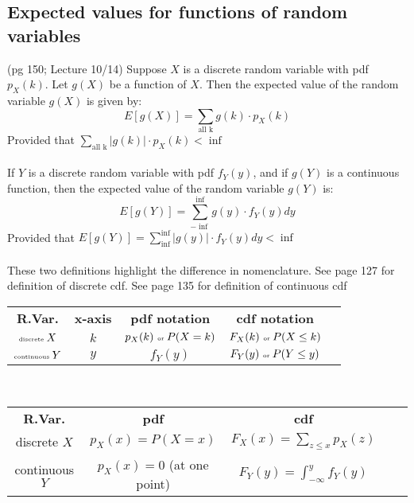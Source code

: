 \subsection{Expected values for functions of random variables}
{\tiny (pg 150; Lecture 10/14)}  Suppose $X$ is a discrete random variable with pdf $p_X(k)$.  Let $g(X)$ be a function of $X$.  Then the expected value of the random variable $g(X)$ is given by: \hfill \\
	\[ E[g(X)] = \sum\limits_{\mbox{all k}} g(k) \cdot p_X(k) \]
Provided that $\sum\limits_{\mbox{all k}} | g(k)| \cdot p_X(k) < \inf$
\hfill \\
\hfill \\
If $Y$ is a discrete random variable with pdf $f_Y(y)$, and if $g(Y)$ is a continuous function, then the expected value of the random variable $g(Y)$ is: \hfill \\
	\[ E[g(Y)] = \sum\limits_{- \inf}^{\inf} g(y) \cdot f_Y(y)dy \]
Provided that $E[g(Y)] = \sum\limits_{\inf}^{\inf} | g(y)| \cdot f_Y(y)dy < \inf$  \hfill \\
\hfill \\

These two definitions highlight the difference in nomenclature.  See page 127 for definition of discrete cdf.  See page 135 for definition of continuous cdf 
\begin{center}
\begin{tabular}{ c c c c c }
 \textbf{R.Var.} & \textbf{x-axis} & \textbf{pdf notation} & \textbf{cdf notation}   \\ 
 $\mbox{\tiny discrete  } X$     & $k$ & $p_X(k)  \mbox{ \tiny or }  P(X=k) $ & $F_X(k) \mbox{ \tiny or } P(X \leq k)  $  \\  
$\mbox{\tiny continuous  } Y$ & $y$ & $f_Y(y)$                                          & $F_Y(y) \mbox{ \tiny or } P(Y \leq y)  $ 
\end{tabular}
\end{center}
\hfill \\


 \begin{center}
\begin{tabular}{ c c c c c }
 \textbf{R.Var.} & \textbf{pdf} & \textbf{cdf}  \\ 
 {discrete  } $X$    & $ p_X(x) = P(X=x)$ & $F_X(x) =  \sum\limits_{z \leq x}p_X(z)$  \\  
 {continuous  } $Y$ & $p_X(x) = 0$ {\tiny (at one point)}  & $F_Y(y) = \int_{-\infty}^{y}f_Y(y)$ \\  
\end{tabular}
\end{center}
\hfill \\
 
